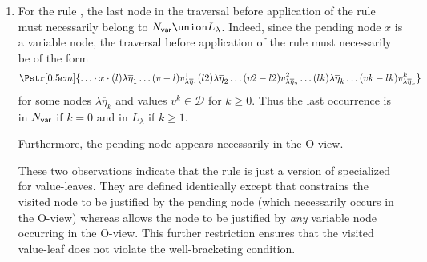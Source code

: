 \begin{remark}
\begin{enumerate}
    \item For the rule , the last node in the traversal before application of the rule must necessarily belong to $N_{\sf var} \union L_\lambda$. Indeed, since the pending node $x$ is a variable node, the traversal before application of the rule must necessarily be of the form
$$\Pstr[0.5cm]{\ldots \cdot x \cdot  (l){\lambda \overline{\eta}_1}\ldots (v-l){v^1_{\lambda \overline{\eta}_1}}
(l2){\lambda \overline{\eta}_2}\ldots (v2-l2){v^2_{\lambda \overline{\eta}_2}}
\ldots (lk){\lambda \overline{\eta}_k}\ldots (vk-lk){v^k_{\lambda \overline{\eta}_k}}
}$$ for some nodes $\lambda \overline{\eta}_k$ and values $v^k \in \mathcal{D}$ for $k\geq 0$.
Thus the last occurrence is in $N_{\sf var}$ if $k=0$ and in $L_\lambda$ if $k\geq1$.

    Furthermore, the pending node appears necessarily in the O-view.

    These two observations indicate that the rule  is just a version of 
    specialized for value-leaves. They are defined identically except that  constrains the visited node
    to be justified by the pending node (which necessarily occurs in the O-view) whereas 
    allows the node to be justified by \emph{any} variable node occurring in the O-view.
    This further restriction ensures that the visited value-leaf does not violate the well-bracketing condition.
\end{enumerate}
\end{remark}
\bigskip

